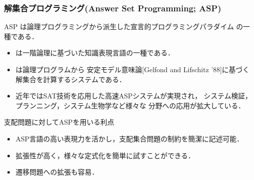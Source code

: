 \documentclass[dvipdfmx,10pt]{beamer}
\begin{document}
\begin{frame}\frametitle{解集合プログラミング(Answer Set Programming; ASP)}
  \begin{block}{}\centering
    ASP は論理プログラミングから派生した宣言的プログラミングパラダイム
    の一種である．
  \end{block}
  \vfill
  \begin{itemize}
  \item {}は一階論理に基づいた知識表現言語の一種である．
  \item {}は論理プログラムから
	安定モデル意味論[Gelfond and Lifschitz '88]に基づく
	解集合を計算するシステムである．
  \item 近年ではSAT技術を応用した高速ASPシステムが実現され，
	システム検証，プランニング，システム生物学など様々な
	分野への応用が拡大している．
 \end{itemize}
 \begin{alertblock}{支配問題に対してASPを用いる利点}
  \begin{itemize}
   \item ASP言語の高い表現力を活かし，支配集合問題の制約を簡潔に記述可能．
   \item 拡張性が高く，様々な定式化を簡単に試すことができる．
   \item 遷移問題への拡張も容易．
  \end{itemize}
 \end{alertblock}
\end{frame}
 
%
%
\end{document}
